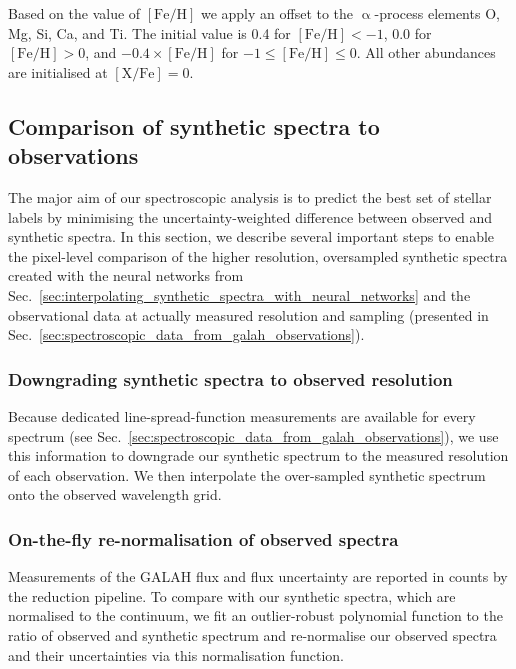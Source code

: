 \documentclass[
  journal=pasa,
  manuscript=research-paper, %
  year=2024,
  volume=37
]{cup-journal}
\newcommand{\feh}{$\mathrm{[Fe/H]}$\xspace}
\begin{document}
Based on the value of \feh we apply an offset to the $\upalpha$-process elements O, Mg, Si, Ca, and Ti. The initial value is 0.4 for $\mathrm{[Fe/H]} < -1$, 0.0 for $\mathrm{[Fe/H]} > 0$, and $-0.4 \times \mathrm{[Fe/H]}$ for $-1 \leq \mathrm{[Fe/H]} \leq 0$. All other abundances are initialised at $\mathrm{[X/Fe]} = 0$.

\subsection{Comparison of synthetic spectra to observations}
\label{sec:comparison_synthetic_spectra_to_observations}

The major aim of our spectroscopic analysis is to predict the best set of stellar labels by minimising the uncertainty-weighted difference between observed and synthetic spectra. In this section, we describe several important steps to enable the pixel-level comparison of the higher resolution, oversampled synthetic spectra created with the neural networks from Sec.~\ref{sec:interpolating_synthetic_spectra_with_neural_networks} and the observational data at actually measured resolution and sampling (presented in Sec.~\ref{sec:spectroscopic_data_from_galah_observations}).

\subsubsection{Downgrading synthetic spectra to observed resolution}

Because dedicated line-spread-function measurements are available for every spectrum (see Sec.~\ref{sec:spectroscopic_data_from_galah_observations}), we use this information to downgrade our synthetic spectrum to the measured resolution of each observation. We then interpolate the over-sampled synthetic spectrum onto the observed wavelength grid.

\subsubsection{On-the-fly re-normalisation of observed spectra}

Measurements of the GALAH flux and flux uncertainty are reported in counts by the reduction pipeline. To compare with our synthetic spectra, which are normalised to the continuum, we fit an outlier-robust polynomial function to the ratio of observed and synthetic spectrum and re-normalise our observed spectra and their uncertainties via this normalisation function.
\end{document}
